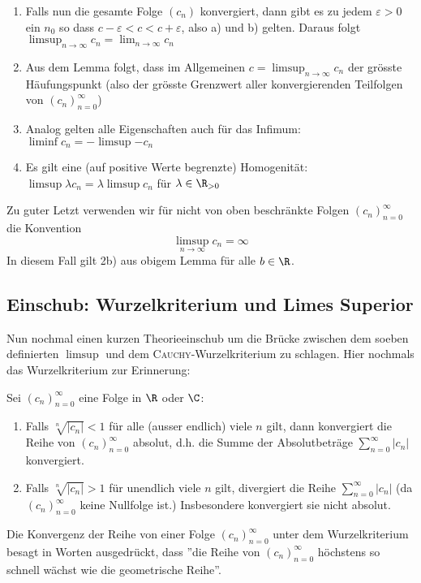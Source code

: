 \begin{remark}
\begin{enumerate}
    \item Falls nun die gesamte Folge $(c_n)$ konvergiert, dann gibt es zu jedem $\varepsilon >0$ ein $n_0$ so dass $c-\varepsilon < c < c + \varepsilon$, also a) und b) gelten. Daraus folgt $\limsup_{n \to \infty} c_n = \lim_{n \to \infty} c_n$
    \item Aus dem Lemma folgt, dass im Allgemeinen $c = \limsup_{n \to \infty} c_n$ der grösste Häufungspunkt (also der grösste Grenzwert aller konvergierenden Teilfolgen von $(c_n)_{n=0}^\infty$)
    \item Analog gelten alle Eigenschaften auch für das Infimum: $\liminf{c_n} = -\limsup{-c_n}$
    \item Es gilt eine (auf positive Werte begrenzte) Homogenität: $\limsup{\lambda c_n} = \lambda \limsup{c_n}$ für $\lambda \in \R_{>0}$
\end{enumerate}
\end{remark}

Zu guter Letzt verwenden wir für nicht von oben beschränkte Folgen $(c_n)_{n=0}^\infty$ die Konvention
$$\limsup_{n \to \infty} c_n = \infty$$
In diesem Fall gilt 2b) aus obigem Lemma für alle $b \in \R$.

\subsection{Einschub: Wurzelkriterium und Limes Superior}
Nun nochmal einen kurzen Theorieeinschub um die Brücke zwischen dem soeben definierten $\limsup$ und dem \textsc{Cauchy}-Wurzelkriterium zu schlagen. Hier nochmals das Wurzelkriterium zur Erinnerung:

Sei $(c_n)_{n=0}^\infty$ eine Folge in $\R$ oder $\C$:
\begin{enumerate}
    \item Falls $\sqrt[n]{|c_n|} < 1$ für alle (ausser endlich) viele $n$ gilt, dann konvergiert die Reihe von $(c_n)_{n=0}^\infty$ absolut, d.h. die Summe der Absolutbeträge $\sum_{n=0}^{\infty}|c_n|$ konvergiert.
    \item Falls $\sqrt[n]{|c_n|} > 1$ für unendlich viele $n$ gilt, divergiert die Reihe $\sum_{n=0}^{\infty}|c_n|$ (da $(c_n)_{n=0}^\infty$ keine Nullfolge ist.) Insbesondere konvergiert sie nicht absolut.
\end{enumerate}

Die Konvergenz der Reihe von einer Folge $(c_n)_{n=0}^\infty$ unter dem Wurzelkriterium besagt in Worten ausgedrückt, dass ''die Reihe von $(c_n)_{n=0}^\infty$ höchstens so schnell wächst wie die geometrische Reihe''.

